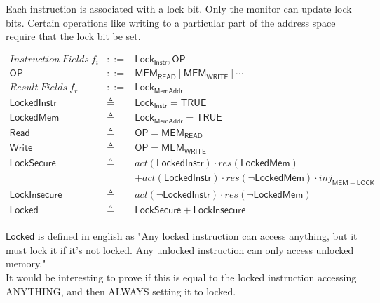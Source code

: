 \documentclass[12pt, letterpaper]{article}
\begin{document}
Each instruction is associated with a lock bit.
Only the monitor can update lock bits.
Certain operations like writing to a particular part of the address space
require that the lock bit be set. 


\[
\begin{array}{rcl}
  \mathit{Instruction\ Fields}\ f_i &::=& \mathsf{Lock_{Instr}}, \mathsf{OP}\\
  \mathsf{OP} &::=& \mathsf{MEM_{READ}}\ |\ \mathsf{MEM_{WRITE}}\ |\ \cdots \\
  \mathit{Result\ Fields}\ f_r &::=& \mathsf{Lock_{MemAddr}}\\
  \mathsf{LockedInstr} &\triangleq& \mathsf{Lock_{Instr}} = \mathsf{TRUE} \\
  \mathsf{LockedMem} &\triangleq& \mathsf{Lock_{MemAddr}} = \mathsf{TRUE} \\
  \mathsf{Read} &\triangleq& \mathsf{OP} = \mathsf{MEM_{READ}}\\
  \mathsf{Write} &\triangleq& \mathsf{OP} = \mathsf{MEM_{WRITE}}\\
  \mathsf{LockSecure} &\triangleq& 
    act(\mathsf{LockedInstr})\cdot res(\mathsf{LockedMem})\\
    &&+
    act(\mathsf{LockedInstr})\cdot res(\neg \mathsf{LockedMem}) \cdot \mathit{inj_{\mathsf{MEM-LOCK}}} \\
  \mathsf{LockInsecure} &\triangleq&
    act(\neg \mathsf{LockedInstr})\cdot res(\neg \mathsf{LockedMem})\\
  \mathsf{Locked} &\triangleq& \mathsf{LockSecure} + \mathsf{LockInsecure}
\end{array}
\]\\
$\mathsf{Locked}$ is defined in english as "Any locked instruction can access anything, but it must lock it if it's not locked.  Any unlocked instruction can only access unlocked memory."\\
It would be interesting to prove if this is equal to the locked instruction accessing ANYTHING, and then ALWAYS setting it to locked.

\end{document}
